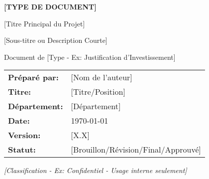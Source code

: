 





\begin{titlepage}
\dollaramalogo[0.6]

\vspace{2cm}

\begin{center}
{\Huge\bfseries\color{DollaramaGreen} [TYPE DE DOCUMENT]}

\vspace{1cm}

{\Large\color{DollaramaGreen} [Titre Principal du Projet]}

\vspace{0.5cm}

{\large\color{DollaramaGreen} [Sous-titre ou Description Courte]}

\vspace{2cm}

{\large Document de [Type - Ex: Justification d'Investissement]}

\vspace{3cm}

\begin{tabular}{ll}
\textbf{Préparé par:} & [Nom de l'auteur] \\
\textbf{Titre:} & [Titre/Position] \\
\textbf{Département:} & [Département] \\
\textbf{Date:} & \today \\
\textbf{Version:} & [X.X] \\
\textbf{Statut:} & [Brouillon/Révision/Final/Approuvé]
\end{tabular}

\vfill

\begin{center}
\textit{[Classification - Ex: Confidentiel - Usage interne seulement]}
\end{center}

\dollaramalogo[0.4]
\end{center}
\end{titlepage}

\setcounter{page}{1}

